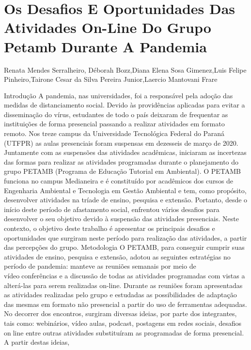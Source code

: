 


\section*{Os Desafios E Oportunidades Das Atividades On-Line Do Grupo Petamb Durante A Pandemia}

Renata Mendes Serralheiro, Déborah Bozz,Diana Elena Sosa Gimenez,Luis Felipe Pinheiro,Tairone Cesar da Silva Pereira Junior,Laercio Mantovani Frare

Introdução
A pandemia, nas universidades, foi a responsável pela adoção das medidas de distanciamento 
social. Devido às providências aplicadas para evitar a disseminação do vírus, estudantes de todo o 
país deixaram de frequentar as instituições de forma presencial passando a realizar atividades em 
formato remoto. Nos treze campus da Universidade Tecnológica Federal do Paraná (UTFPR) as 
aulas presenciais foram suspensas em dezesseis de março de 2020. Juntamente com as suspensões 
das atividades acadêmicas, iniciaram as incertezas das formas para realizar as atividades 
programadas durante o planejamento do grupo PETAMB (Programa de Educação Tutorial em 
Ambiental). O PETAMB funciona no campus Medianeira e é constituído por acadêmicos dos 
cursos de Engenharia Ambiental e Tecnologia em Gestão Ambiental e tem, como propósito, 
desenvolver atividades na tríade de ensino, pesquisa e extensão. Portanto, desde o início deste 
período de afastamento social, enfrentou vários desafios para desenvolver o seu objetivo devido à 
suspensão das atividades presenciais. Neste contexto, o objetivo deste trabalho é apresentar os 
principais desafios e oportunidades que surgiram neste período para realização das atividades, a 
partir das percepções do grupo.
Metodologia
O PETAMB, para conseguir cumprir suas atividades de ensino, pesquisa e extensão, adotou as 
seguintes estratégias no período de pandemia: manteve as reuniões semanais por meio de vídeoconferências e a discussão de todas as atividades programadas com vistas a alterá-las para serem 
realizadas on-line. Durante as reuniões foram apresentadas as atividades realizadas pelo grupo e 
estudadas as possibilidades de adaptação das mesmas em formato não presencial a partir do uso 
de ferramentas adequadas. No decorrer dos encontros, surgiram diversas ideias, por parte dos 
integrantes, tais como: webinários, vídeo aulas, podcast, postagens em redes sociais, desafios online entre outras atividades substituíram as programadas de forma presencial. A partir destas ideias, 

